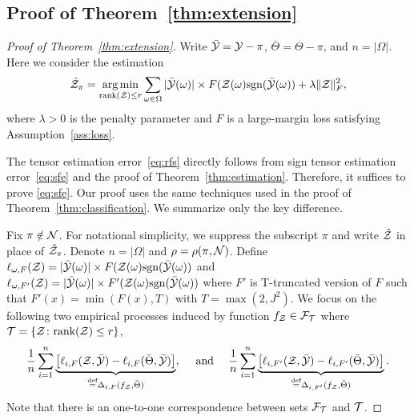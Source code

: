 \documentclass[twoside,11pt]{article}
\theoremstyle{plain}
\theoremstyle{definition}
\newcommand*{\KeepStyleUnderBrace}[1]{%
  \mathop{%
    \mathchoice
    {\underbrace{\displaystyle#1}}%
    {\underbrace{\textstyle#1}}%
    {\underbrace{\scriptstyle#1}}%
    {\underbrace{\scriptscriptstyle#1}}%
  }\limits
}
\def\sign{\textup{sgn}}
\def\rank{\textup{rank}}
\begin{document}
\subsection{Proof of Theorem~\ref{thm:extension}}\label{sec:hinge}


\begin{proof}[Proof of Theorem~\ref{thm:extension}]
Write $\bar {\mathcal{Y}}=\mathcal{Y}-\pi$, $\bar \Theta=\Theta-\pi$, and $n=|\Omega|$. Here we consider the estimation 
 \begin{align}\label{eq:largemgopt}
  \hat\tZ_\pi = \argmin_{\text{rank}(\tZ)\leq r}\sum_{\omega\in\Omega} |\bar\tY(\omega)|\times F(\tZ(\omega)\sign(\bar \tY(\omega))+\lambda\FnormSize{}{\tZ}^2,
 \end{align}
 where $\lambda>0$ is the penalty parameter and $F$ is  a large-margin loss satisfying Assumption~\ref{ass:loss}.
 
The tensor estimation error~\eqref{eq:rfs}  directly follows from sign tensor estimation error~\eqref{eq:sfe} and the proof of Theorem~\ref{thm:estimation}.
Therefore, it suffices to prove \eqref{eq:sfe}. Our  proof uses  the same techniques used in the proof of  Theorem~\ref{thm:classification}. We summarize only the key difference.

Fix $\pi\notin\mathcal{N}$. For notational simplicity, we suppress the subscript $\pi$ and write $\hat {\mathcal{Z}}$ in place of $\hat {\mathcal{Z}}_\pi$. Denote $n=|\Omega|$ and $\rho=\rho(\pi, \mathcal{N})$.  
Define $\ell_{\omega,F}(\tZ) =  |\bar\tY(\omega)|\times F(\tZ(\omega)\sign(\bar \tY(\omega))$ and $\ell_{\omega,F'}(\tZ) =  |\bar\tY(\omega)|\times F'(\tZ(\omega)\sign(\bar \tY(\omega))$ where $F'$ is T-truncated version of $F$ such that $F'(x) =  \min(F(x),T)$ with $T=\max(2,J^2)$.  
We focus on the following two empirical processes induced by function $f_{\mathcal{Z}}\in \mathcal{F}_{\mathcal{T}}$ where $\tT=\{\tZ\colon \rank(\tZ)\leq r\}$,
\begin{align}\label{eq:empirical}
{1\over n}\sum_{i=1}^n \KeepStyleUnderBrace{\left[\ell_{i,F}(\tZ, \bar \tY)-\ell_{i,F}(\bar \Theta, \bar \tY)\right]}_{\stackrel{\text{def}}{=}\Delta_{i,F}(f_\tZ, \bar\Theta)},\quad\text { and }\quad  {1\over n}\sum_{i=1}^n \KeepStyleUnderBrace{\left[\ell_{i,F'}(\tZ, \bar \tY)-\ell_{i,F'}(\bar \Theta, \bar \tY)\right]}_{\stackrel{\text{def}}{=}\Delta_{i,F'}(f_\tZ, \bar\Theta)}.
\end{align}
Note that there is an one-to-one correspondence between sets $\mathcal{F}_{\mathcal{T}}$ and $\mathcal{T}$. 


\end{proof}
\end{document}

